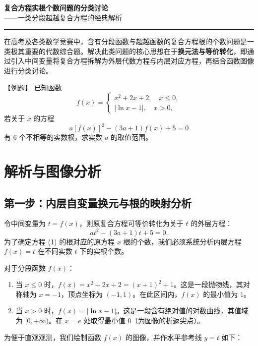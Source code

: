 \documentclass[11pt,a4paper]{ctexart}
\begin{document}
\begin{center}
  {\bfseries 复合方程实根个数问题的分类讨论}\\[3mm]
  {\large ——一类分段超越复合方程的经典解析}\\[2mm]
  \rule{0.85\linewidth}{0.5pt}
\end{center}

在高考及各类数学竞赛中，含有分段函数与超越函数的复合方程根的个数问题是一类极其重要的代数综合题。解决此类问题的核心思想在于\textbf{换元法与等价转化}，即通过引入中间变量将复合方程拆解为外层代数方程与内层对应方程，再结合函数图像进行分类讨论。

\begin{exbox}{【例题】}
已知函数
\[
f(x)=
\begin{cases}
x^2+2x+2,\quad x\le 0,\\
|\ln x-1|,\quad x>0,
\end{cases}
\]
若关于 \(x\) 的方程
\[
a[f(x)]^2-(3a+1)f(x)+5=0
\]
有 6 个不相等的实数根，求实数 \(a\) 的取值范围。
\end{exbox}

\section{解析与图像分析}

\subsection{第一步：内层自变量换元与根的映射分析}

令中间变量为 \(t = f(x)\)，则原复合方程可等价转化为关于 \(t\) 的外层方程：
\[
at^2-(3a+1)t+5=0. \tag{1}
\]
为了确定方程 (1) 的根对应的原方程 \(x\) 根的个数，我们必须系统分析内层方程 \(f(x) = t\) 在不同实数 \(t\) 下的实根个数。

对于分段函数 \(f(x)\)：
\begin{enumerate}
  \item 当 \(x \le 0\) 时，\(f(x) = x^2 + 2x + 2 = (x+1)^2 + 1\)。这是一段抛物线，其对称轴为 \(x = -1\)，顶点坐标为 \((-1, 1)\)。在此区间内，\(f(x)\) 的最小值为 1。
  \item 当 \(x > 0\) 时，\(f(x) = |\ln x - 1|\)。这是一段含有绝对值的对数曲线，其值域为 \([0, +\infty)\)。在 \(x = e\) 处取得最小值 0（为图像的折返尖点）。
\end{enumerate}

为便于直观观测，我们绘制函数 \(f(x)\) 的图像，并作水平参考线 \(y = t\) 如下：
\end{document}
